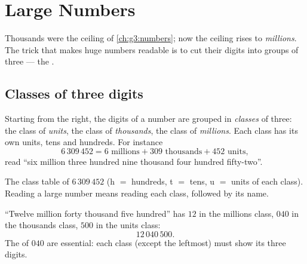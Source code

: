 \chapter{Large Numbers}\label{ch:g4:numbers}

Thousands were the ceiling of \cref{ch:g3:numbers}; now the ceiling
rises to \emph{millions}. The trick that makes huge numbers readable
is to cut their digits into groups of three --- the .

\section{Classes of three digits}

\begin{definition}[Classes]\label{def:g4:numbers:classes}
Starting from the right, the digits of a number are grouped in
\emph{classes} of three: the class of \emph{units}, the class of
\emph{thousands}, the class of \emph{millions}. Each class has its
own units, tens and hundreds. For instance
\[
6\,309\,452 = 6 \text{ millions} + 309 \text{ thousands}
+ 452 \text{ units},
\]
read ``six million three hundred nine thousand four hundred
fifty-two''.
\end{definition}

\begin{omfigure}

{\small The class table of $6\,309\,452$ (h $=$ hundreds, t $=$
tens, u $=$ units of each class). Reading a large number means
reading each class, followed by its name.}
\end{omfigure}

\begin{example}\label{ex:g4:numbers:write}
``Twelve million forty thousand five hundred'' has $12$ in the
millions class, $040$ in the thousands class, $500$ in the units
class:
\[
12\,040\,500 .
\]
The  of $040$ are essential: each class (except the leftmost)
must show its three digits.
\end{example}

